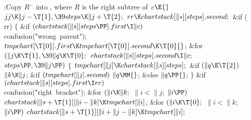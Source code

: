 \Y\B\4:Copy $R^-$ into , where $R$ is the
right subtree of~$c$\X${}\E{}$\6
$\\{jj}\K\|j-\T{1},\39\\{steps}\K\|j+\T{2};{}$\6
${}\\{rr}\K\\{chartstack}[\|s][\\{steps}].\\{second};{}$\6
\&{if} (\\{rr})\5
${}\{{}$\1\6
\&{if} ${}(\\{chartstack}[\|s][\\{steps}\PP].\\{first}\I\|c){}$\1\5
\\{confusion}(\.{"wrong\ parent"});\2\6
${}\\{tmpchart}[\T{0}].\\{first}\K\\{tmpchart}[\T{0}].\\{second}\K\T{0}{}$;\6
\&{for} ${}(\|j\K\T{1},\39\|q\K\T{0};{}$ ${}\\{chartstack}[\|s][\\{steps}].%
\\{second}\I\|c;{}$ ${}\\{steps}\PP,\39\|j\PP){}$\5
${}\{{}$\1\6
${}\\{tmpchart}[\|j]\K\\{chartstack}[\|s][\\{steps}];{}$\6
\&{if} ${}(\|q\E\T{2}){}$\1\5
${}\|k\K\|j{}$;\2\6
\&{if} ${}(\\{tmpchart}[\|j].\\{second}){}$\1\5
${}\|q\MM{}$;\5
\2\&{else}\1\5
${}\|q\PP{}$;\2\6
\4${}\}{}$\2\6
\&{if} ${}(\\{chartstack}[\|s][\\{steps}].\\{first}\I\\{rr}){}$\1\5
\\{confusion}(\.{"right\ bracket"});\2\6
\&{for} ${}(\|i\K\|k;{}$ ${}\|i<\|j;{}$ ${}\|i\PP){}$\1\5
${}\\{chartstack}[\|s+\T{1}][\|i-\|k]\K\\{tmpchart}[\|i]{}$;\2\6
\&{for} ${}(\|i\K\T{0};{}$ ${}\|i<\|k;{}$ ${}\|i\PP){}$\1\5
${}\\{chartstack}[\|s+\T{1}][\|i+\|j-\|k]\K\\{tmpchart}[\|i];{}$\2\6
